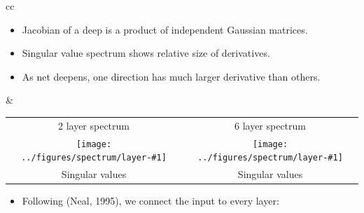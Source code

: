 \documentclass[portrait,a0b,final,a4resizeable]{include/a0poster}
\def\jointspacing{\vspace{0.3in}}
\newcommand{\spectrumpic}[1]{
\texttt{[image: ../figures/spectrum/layer-\#1]}}
\begin{document}
\begin{poster}
\begin{multicols}{2}
\jointspacing










\begin{tabular}{cc}
\begin{minipage}[c]{0.4\columnwidth}

\begin{itemize}
\item Jacobian of a deep \gp{} is a product of independent Gaussian matrices.
\item Singular value spectrum shows relative size of derivatives.
\item As net deepens, one direction has much larger derivative than others.
\end{itemize}

\end{minipage}
&
\begin{minipage}[c]{0.55\columnwidth}
\begin{centering}
\begin{tabular}{cc}
2 layer spectrum & 6 layer spectrum \\
\hspace{-0.16in} \spectrumpic{2} &
\hspace{-0.16in} \spectrumpic{6} \\
Singular values & Singular values  
\end{tabular}
\end{centering}
\end{minipage}
\end{tabular}






\jointspacing
\jointspacing

\centering
\begin{itemize}
	\item 
	Following {\color{mydarkblue} (Neal, 1995)}, we connect the input to every layer:
\end{itemize}

\jointspacing




\end{multicols}
\end{poster}
\end{document}
